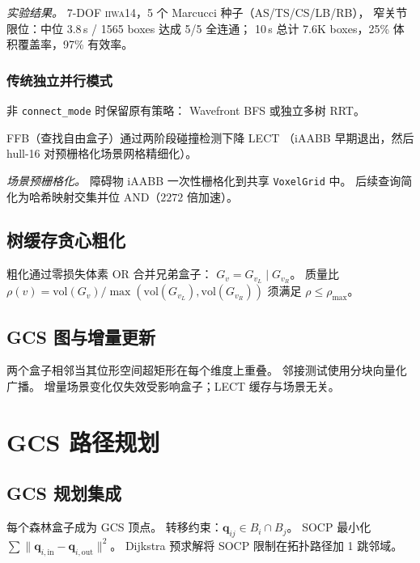 \documentclass[journal]{IEEEtran}
\begin{document}
\emph{实验结果。}
7-DOF \textsc{iiwa14}，5 个 Marcucci 种子（AS/TS/CS/LB/RB），
窄关节限位：中位 3.8\,s / 1565 boxes 达成 5/5 全连通；
10\,s 总计 7.6K boxes，25\% 体积覆盖率，97\% 有效率。

\subsubsection{传统独立并行模式}

非 \texttt{connect\_mode} 时保留原有策略：
Wavefront BFS 或独立多树 RRT。

FFB（查找自由盒子）通过两阶段碰撞检测下降 LECT
（iAABB 早期退出，然后 hull-16 对预栅格化场景网格精细化）。

\emph{场景预栅格化。}
障碍物 iAABB 一次性栅格化到共享 \texttt{VoxelGrid} 中。
后续查询简化为哈希映射交集并位 AND（$2272$ 倍加速）。

\subsection{树缓存贪心粗化}\label{sec:coarsen}

粗化通过零损失体素 OR 合并兄弟盒子：
$G_{v} = G_{v_L} \mathbin{|} G_{v_R}$。
质量比
$\rho(v) = \mathrm{vol}(G_v) / \max(\mathrm{vol}(G_{v_L}), \mathrm{vol}(G_{v_R}))$
须满足 $\rho \leq \rho_\text{max}$。

\subsection{GCS 图与增量更新}\label{sec:gcs_graph}

两个盒子相邻当其位形空间超矩形在每个维度上重叠。
邻接测试使用分块向量化广播。
增量场景变化仅失效受影响盒子；LECT 缓存与场景无关。

\section{GCS 路径规划}\label{sec:planner}

\subsection{GCS 规划集成}\label{sec:gcs_planning}

每个森林盒子成为 GCS 顶点。
转移约束：$\bm{q}_{ij} \in B_i \cap B_j$。
SOCP 最小化 $\sum \|\bm{q}_{i,\text{in}} - \bm{q}_{i,\text{out}}\|^2$。
Dijkstra 预求解将 SOCP 限制在拓扑路径加 1 跳邻域。
\end{document}
